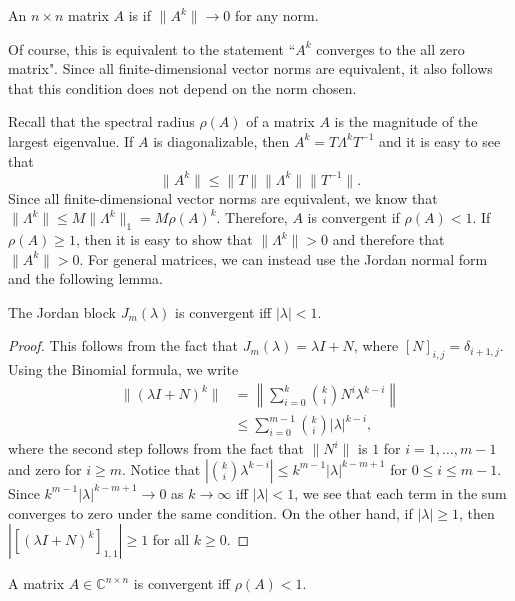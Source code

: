 \begin{definition}
An $n\times n$  matrix $A$ is  if $\| A^k \| \rightarrow 0$ for any norm.
\end{definition}
Of course, this is equivalent to the statement ``$A^k$ converges to the all zero matrix".
Since all finite-dimensional vector norms are equivalent, it also follows that this condition does not depend on the norm chosen.

Recall that the spectral radius $\rho(A)$ of a matrix $A$ is the magnitude of the largest eigenvalue.
If $A$ is diagonalizable, then $A^k = T \Lambda^k T^{-1}$ and it is easy to see that
\[ \| A^k \| \leq \| T \| \| \Lambda^k \| \| T^{-1} \|. \]
Since all finite-dimensional vector norms are equivalent, we know that $ \| \Lambda^k \| \leq M \| \Lambda^k \|_1 = M \rho(A)^k $.
Therefore, $A$ is convergent if $\rho(A)<1$.
If $\rho(A)\geq 1$, then it is easy to show that $\| \Lambda^k \| > 0$ and therefore that $\| A^k \| > 0$.
For general matrices, we can instead use the Jordan normal form and the following lemma.

\begin{lemma}
The Jordan block $J_m (\lambda)$ is convergent iff $| \lambda | <1$.
\end{lemma}
\begin{proof}
This follows from the fact that $J_m (\lambda) = \lambda I + N$, where $[ N ]_{i,j} = \delta_{i+1,j}$.
Using the Binomial formula, we write
\begin{align*}
\| (\lambda I + N)^k \|
& = \left\| \sum_{i=0}^k \binom{k}{i} N^{i} \lambda^{k-i} \right\| \\
& \leq \sum_{i=0}^{m-1} \binom{k}{i} | \lambda |^{k-i},
\end{align*}
where the second step follows from the fact that $\| N^i \|$ is $1$ for $i=1,\ldots,m-1$ and zero for $i\geq m$.
Notice that $| \binom{k}{i} \lambda^{k-i} | \leq k^{m-1} | \lambda |^{k-m+1} $ for $0 \leq i \leq m-1$.
Since $k^{m-1} | \lambda |^{k-m+1} \rightarrow 0$ as $k\rightarrow \infty$ iff $| \lambda | <1$, we see that each term in the sum converges to zero under the same condition.
On the other hand, if $ |\lambda | \geq 1$, then $| \left[ (\lambda I + N)^k \right]_{1,1} | \geq 1$ for all $k\geq 0$.
\end{proof}

\begin{theorem}
A matrix $A \in \mathbb{C}^{n\times n}$ is convergent iff $\rho(A)<1$.
\end{theorem}

